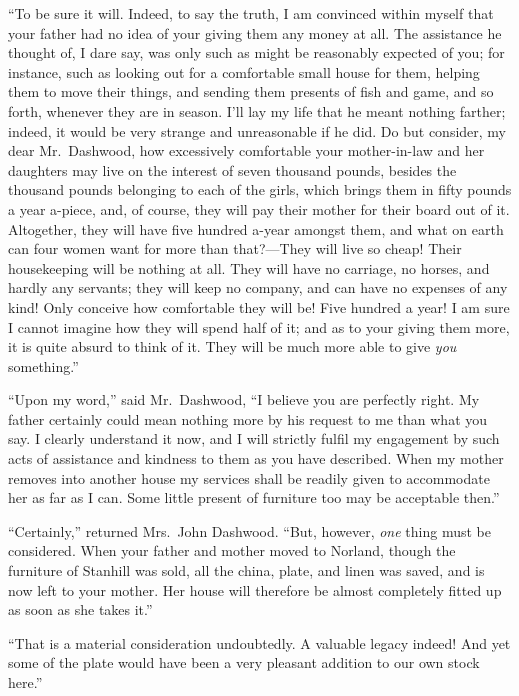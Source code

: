 ``To be sure it will.  Indeed, to say the truth,
I am convinced within myself that your father had no idea
of your giving them any money at all.  The assistance
he thought of, I dare say, was only such as might be
reasonably expected of you; for instance, such as looking
out for a comfortable small house for them, helping them
to move their things, and sending them presents of fish
and game, and so forth, whenever they are in season.
I'll lay my life that he meant nothing farther; indeed,
it would be very strange and unreasonable if he did.
Do but consider, my dear Mr.\ Dashwood, how excessively
comfortable your mother-in-law and her daughters may live
on the interest of seven thousand pounds, besides the
thousand pounds belonging to each of the girls, which brings
them in fifty pounds a year a-piece, and, of course,
they will pay their mother for their board out of it.
Altogether, they will have five hundred a-year amongst them,
and what on earth can four women want for more than
that?---They will live so cheap! Their housekeeping will
be nothing at all.  They will have no carriage, no horses,
and hardly any servants; they will keep no company,
and can have no expenses of any kind!  Only conceive
how comfortable they will be!  Five hundred a year! I am
sure I cannot imagine how they will spend half of it;
and as to your giving them more, it is quite absurd to think
of it.  They will be much more able to give \emph{you} something.''

``Upon my word,'' said Mr.\ Dashwood, ``I believe you
are perfectly right.  My father certainly could mean
nothing more by his request to me than what you say.
I clearly understand it now, and I will strictly fulfil
my engagement by such acts of assistance and kindness
to them as you have described.  When my mother removes
into another house my services shall be readily given
to accommodate her as far as I can.  Some little present
of furniture too may be acceptable then.''

``Certainly,'' returned Mrs.\ John Dashwood.  ``But, however,
\emph{one} thing must be considered.  When your father and mother
moved to Norland, though the furniture of Stanhill
was sold, all the china, plate, and linen was saved,
and is now left to your mother.  Her house will therefore
be almost completely fitted up as soon as she takes it.''

``That is a material consideration undoubtedly.
A valuable legacy indeed! And yet some of the plate would
have been a very pleasant addition to our own stock here.''

